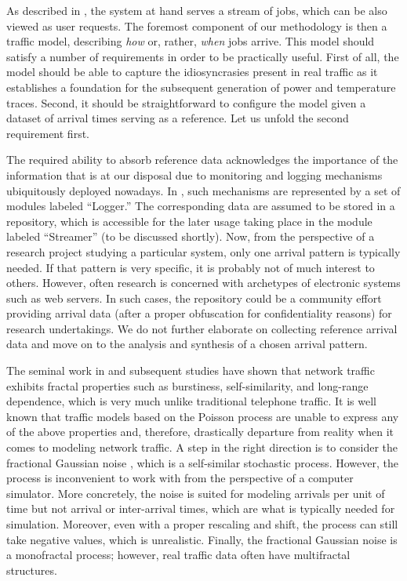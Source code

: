 As described in , the system at hand serves a stream
of jobs, which can be also viewed as user requests. The foremost component of
our methodology is then a traffic model, describing \emph{how} or, rather,
\emph{when} jobs arrive. This model should satisfy a number of requirements in
order to be practically useful. First of all, the model should be able to
capture the idiosyncrasies present in real traffic as it establishes a
foundation for the subsequent generation of power and temperature traces.
Second, it should be straightforward to configure the model given a dataset of
arrival times serving as a reference. Let us unfold the second requirement
first.

The required ability to absorb reference data acknowledges the importance of the
information that is at our disposal due to monitoring and logging mechanisms
ubiquitously deployed nowadays. In , such mechanisms are
represented by a set of modules labeled ``Logger.'' The corresponding data are
assumed to be stored in a repository, which is accessible for the later usage
taking place in the module labeled ``Streamer'' (to be discussed shortly). Now,
from the perspective of a research project studying a particular system, only
one arrival pattern is typically needed. If that pattern is very specific, it is
probably not of much interest to others. However, often research is concerned
with archetypes of electronic systems such as web servers. In such cases, the
repository could be a community effort providing arrival data (after a proper
obfuscation for confidentiality reasons) for research undertakings. We do not
further elaborate on collecting reference arrival data and move on to the
analysis and synthesis of a chosen arrival pattern.

The seminal work in \cite{leland1994} and subsequent studies have shown that
network traffic exhibits fractal properties such as burstiness, self-similarity,
and long-range dependence, which is very much unlike traditional telephone
traffic. It is well known that traffic models based on the Poisson process
\cite{lifshits2014} are unable to express any of the above properties and,
therefore, drastically departure from reality when it comes to modeling network
traffic. A step in the right direction is to consider the fractional Gaussian
noise \cite{lifshits2014}, which is a self-similar stochastic process. However,
the process is inconvenient to work with from the perspective of a computer
simulator. More concretely, the noise is suited for modeling arrivals per unit
of time but not arrival or inter-arrival times, which are what is typically
needed for simulation. Moreover, even with a proper rescaling and shift, the
process can still take negative values, which is unrealistic. Finally, the
fractional Gaussian noise is a monofractal process; however, real traffic data
often have multifractal structures.

